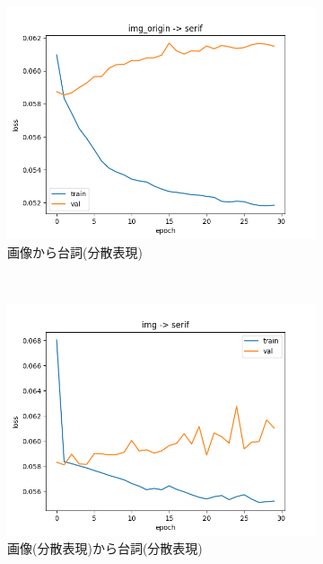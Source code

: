 \documentclass[onecolumn]{ujarticle}   %
\begin{document}
	\begin{figure}[hb]
		\centering
		\begin{subfigure}{0.49\columnwidth}
			\centering
			\includegraphics[width=1.0\columnwidth]{data/ConvMLP_imgserif_loss.png}
				\caption{画像から台詞(分散表現)}
		\end{subfigure}\\
		\begin{subfigure}{0.49\columnwidth}
			\centering
			\includegraphics[width=1.0\columnwidth]{data/MLP_imgserif_loss.png}
				\caption{画像(分散表現)から台詞(分散表現)}
		\end{subfigure}
		\begin{subfigure}{0.49\columnwidth}
			\centering

\end{subfigure}
\end{figure}
\end{document}
